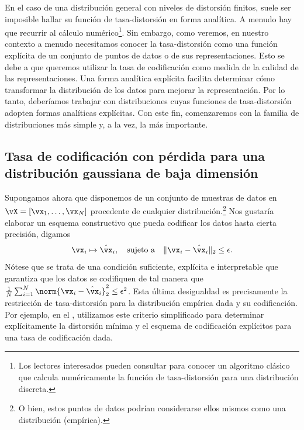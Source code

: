 \documentclass[../../book-main.tex]{subfiles}
\begin{document}
En el caso de una distribución general con niveles de distorsión finitos, suele
ser imposible hallar su función de tasa-distorsión
en forma analítica. A menudo hay que recurrir al
cálculo numérico\footnote{Los lectores interesados pueden consultar
    \cite{Blahut-1972} para conocer un algoritmo clásico que calcula numéricamente la
función de tasa-distorsión para una distribución discreta.}.
Sin embargo, como veremos, en nuestro contexto a menudo necesitamos conocer
la tasa-distorsión como una función explícita de un conjunto de puntos de datos
o de sus representaciones. Esto se debe a que queremos utilizar la tasa de codificación
como medida de la calidad de las representaciones. Una forma analítica explícita facilita 
determinar cómo transformar la distribución de los datos para mejorar la representación.
Por lo tanto, deberíamos trabajar con
distribuciones cuyas funciones de tasa-distorsión adopten formas analíticas
explícitas. Con este fin, comenzaremos con la familia de distribuciones más simple y, a la vez,
la más importante.

\subsection{Tasa de codificación con pérdida para una distribución gaussiana
de baja dimensión}\label{subsec:lossy DR}
Supongamos ahora que disponemos de un conjunto de muestras de datos en $\vX = [\vx_1,
\ldots, \vx_N]$ procedente de cualquier distribución.\footnote{O bien, estos puntos de datos
podrían considerarse ellos mismos como una distribución (empírica).} Nos gustaría
elaborar un esquema constructivo que pueda codificar los datos
hasta cierta precisión, digamos
\begin{equation}
    \vx_i \mapsto \hat \vx_i, \quad \mbox{sujeto a} \quad \|\vx_i -
    \hat \vx_i\|_2 \le \epsilon.
\end{equation}
Nótese que se trata de una condición suficiente, explícita e interpretable que
garantiza que los datos se codifiquen de tal manera que \(\frac{1}{N}\sum_{i = 1}^{N}
\norm{\vx_i- \hat \vx_i}_2^{2} \le \epsilon^{2}\). Esta última
desigualdad es precisamente la restricción de tasa-distorsión para la distribución
empírica dada y su codificación. Por ejemplo, en el
, utilizamos este
criterio simplificado para determinar explícitamente la distorsión mínima y
el esquema de codificación explícitos para una tasa de codificación dada.
\end{document}
